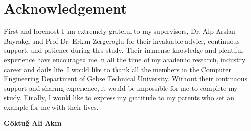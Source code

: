 \chapter*{Acknowledgement}

First and foremost I am extremely grateful to my supervisors, Dr. Alp Arslan Bayrakçı and Prof Dr. Erkan Zergeroğlu for their invaluable advice, continuous support, and patience during this study. Their immense knowledge and plentiful experience have encouraged me in all the time of my academic research, industry career and daily life. I would like to thank all the members in the Computer Engineering Department of Gebze Technical University. Without their continuous support and sharing experience, it would be impossible for me to complete my study.  Finally, I would like to express my gratitude to my parents who set an example for me with their lives.



\vspace{1cm}
\begin{flushright}
\textbf{Göktuğ Ali Akın} %
\end{flushright}
\clearpage